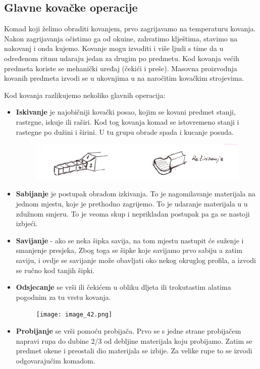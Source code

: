 \documentclass[a4paper,12pt]{article}
\numberwithin{figure}{section}
\begin{document}
\subsection{Glavne kovačke operacije}
Komad koji želimo obraditi kovanjem, prvo zagrijavamo na temperaturu kovanja. Nakon zagrijavanja očistimo ga od okuine, zahvatimo klještima, stavimo na nakovanj i onda kujemo. Kovanje mogu izvoditi i više ljudi s time da u određenom ritmu udaraju jedan za drugim po predmetu. Kod kovanja većih predmeta koriste se mehanički uređaj (čekići i preše). Masovna proizvodnja kovanih predmeta izvodi se u ukovnjima u na naročitim kovačkim strojevima.\par
Kod kovanja razlikujemo nekoliko glavnih operacija:
\begin{itemize}
\item \textbf{Iskivanje} je najobičniji kovački posao, kojim se kovani predmet stanji, rastrgne, iskuje ili raširi. Kod tog kovanja komad se istovremeno stanji i rastegne po dužini i širini. U tu grupu obrade spada i kucanje posuda.
\begin{figure}[!h]
\centering
\includegraphics[scale=0.15]{image_41-1.png}
\end{figure}
\FloatBarrier
\item \textbf{Sabijanje} je postupak obradom izkivanja. To je nagomilavanje materijala na jednom mjestu, koje je prethodno zagrijemo. To je udaranje materijala u u zdužnom smjeru. To je veoma skup i neprikladan postupak pa ga se nastoji izbjeći.
\item \textbf{Savijanje} - ako se neka šipka savija, na tom mjestu nastupit će suženje i smanjenje presjeka, Zbog toga se šipke koje savijamo prvo sabiju a zatim saviju, i ovdje se savijanje može obavljati oko nekog okruglog profila, a izvodi se ručno kod tanjih šipki.
\item \textbf{Odsjecanje} se vrši ili čekićem u obliku dljeta ili trokutastim alatima pogodnim za tu vrstu kovanja.
\begin{figure}[!h]
\centering
\texttt{[image: image\_42.png]}
\end{figure}
\FloatBarrier
\item \textbf{Probijanje} se vrši pomoću probijača. Prvo se s jedne strane probijačem napravi rupa do dubine 2/3 od debljine materijala koju probijamo. Zatim se predmet okene i preostali dio materijala se izbije. Za velike rupe to se izvodi odgovarajućim komadom.

\end{itemize}
\end{document}

